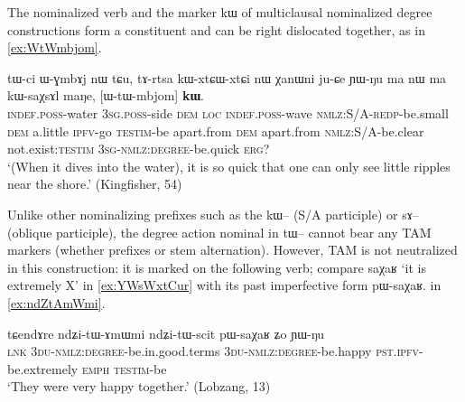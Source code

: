 \documentclass[oldfontcommands,oneside,a4paper,11pt]{article}
\newcommand{\ipa}[1]{{\phon #1}} %
\newcommand{\zh}[1]{{\cn #1}}
\begin{document}
The nominalized verb and the marker \ipa{kɯ} of multiclausal  nominalized degree constructions form a constituent and can be right dislocated together, as in \ref{ex:WtWmbjom}.

 \begin{exe}
\ex \label{ex:WtWmbjom}
\gll 
\ipa{tɯ-ci}  	\ipa{ɯ-ɣmbɤj}  	\ipa{nɯ}  	\ipa{tɕu,}  	  	\ipa{tɤ-rtsa}  	\ipa{kɯ-xtɕɯ-xtɕi}  	\ipa{nɯ}  	\ipa{χanɯni}  	\ipa{ju-ɕe}  	\ipa{ɲɯ-ŋu}  	\ipa{ma}  	\ipa{nɯ}  	\ipa{ma}  	\ipa{kɯ-saχsɤl}  	\ipa{maŋe,}  	[\ipa{ɯ-tɯ-mbjom}]  	\ipa{\textbf{kɯ}.}  \\
\textsc{indef.poss}-water \textsc{3sg.poss}-side \textsc{dem} \textsc{loc} \textsc{indef.poss}-wave \textsc{nmlz:S/A-redp}-be.small \textsc{dem} a.little \textsc{ipfv}-go \textsc{testim}-be apart.from \textsc{dem} apart.from   \textsc{nmlz:S/A}-be.clear not.exist:\textsc{testim} \textsc{3sg-nmlz:degree}-be.quick \textsc{erg?} \\
\glt `(When it dives into the water), it is so quick that one can only see little ripples near the shore.'
 (Kingfisher, 54)
\end{exe}

Unlike other nominalizing prefixes such as the \ipa{kɯ--} (S/A participle) or \ipa{sɤ--} (oblique participle), the degree action nominal in \ipa{tɯ--} cannot bear any TAM markers (whether prefixes or stem alternation). However, TAM is not neutralized in this construction: it is marked on the following verb; compare \ipa{saχaʁ} `it is extremely X' in \ref{ex:YWsWxtCur} with its past imperfective form \ipa{pɯ-saχaʁ}.
in \ref{ex:ndZtAmWmi}.

 \begin{exe}
\ex \label{ex:ndZtAmWmi}
\gll 
 \ipa{tɕendɤre}  	\ipa{ndʑi-tɯ-ɤmɯmi}  	\ipa{ndʑi-tɯ-scit}  	\ipa{pɯ-saχaʁ}  	\ipa{ʑo}  	\ipa{ɲɯ-ŋu}  \\
 \textsc{lnk} \textsc{3du-nmlz:degree}-be.in.good.terms \textsc{3du-nmlz:degree}-be.happy \textsc{pst.ipfv}-be.extremely \textsc{emph} \textsc{testim}-be \\
 \glt `They were very happy together.' (Lobzang, 13)
\end{exe}

  
\end{document}
